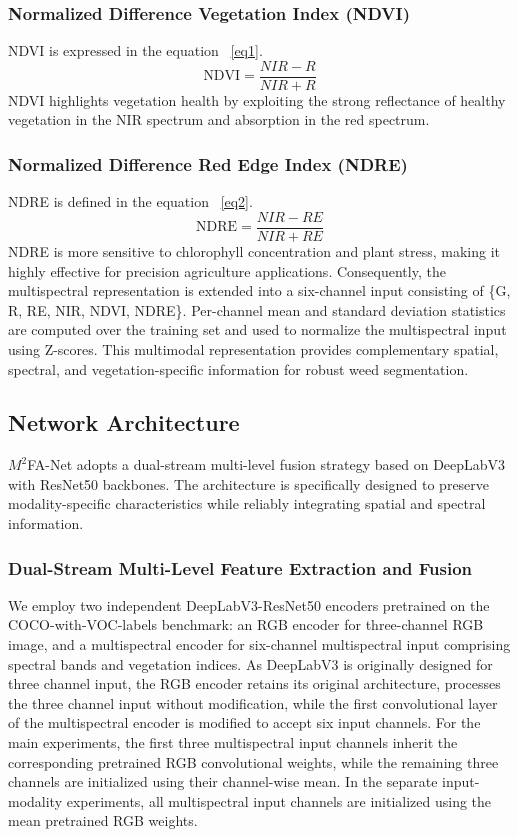 \documentclass[pdflatex,sn-mathphys-num]{sn-jnl}
\begin{document}
\subsubsection{Normalized Difference Vegetation Index (NDVI)}
NDVI is expressed in the equation ~\ref{eq1}.
\begin{equation}
\text{NDVI} = \frac{NIR - R}{NIR + R}\label{eq1}
\end{equation}
NDVI \cite{rouse1974ndvi} highlights vegetation health by exploiting the strong reflectance of healthy vegetation in the NIR spectrum and absorption in the red spectrum.
\subsubsection{Normalized Difference Red Edge Index (NDRE)}
NDRE is defined in the equation ~\ref{eq2}.
\begin{equation}
\text{NDRE} = \frac{NIR - RE}{NIR + RE}\label{eq2}
\end{equation}
NDRE \cite{gitelson1997chlorophyll} is more sensitive to chlorophyll concentration and plant stress, making it highly effective for precision agriculture applications. Consequently, the multispectral representation is extended into a six-channel input consisting of \{G, R, RE, NIR, NDVI, NDRE\}. Per-channel mean and standard deviation statistics are computed over the training set and used to normalize the multispectral input using Z-scores. This multimodal representation provides complementary spatial, spectral, and vegetation-specific information for robust weed segmentation.

\subsection{Network Architecture}
$M^2$FA-Net adopts a dual-stream multi-level fusion strategy based on DeepLabV3 with ResNet50 backbones. The architecture is specifically designed to preserve modality-specific characteristics while reliably integrating spatial and spectral information.


\subsubsection{Dual-Stream Multi-Level Feature Extraction and Fusion}
We employ two independent DeepLabV3-ResNet50 encoders pretrained on the COCO-with-VOC-labels benchmark: an RGB encoder for three-channel RGB image, and a multispectral encoder for six-channel multispectral input comprising spectral bands and vegetation indices. As DeepLabV3 is originally designed for three channel input, the RGB encoder retains its original architecture, processes the three channel input without modification, while the first convolutional layer of the multispectral encoder is modified to accept six input channels. For the main experiments, the first three
multispectral input channels inherit the
corresponding pretrained RGB convolutional
weights, while the remaining three channels
are initialized using their channel-wise mean.
In the separate input-modality experiments,
all multispectral input channels are initialized
using the mean pretrained RGB weights.
\end{document}
